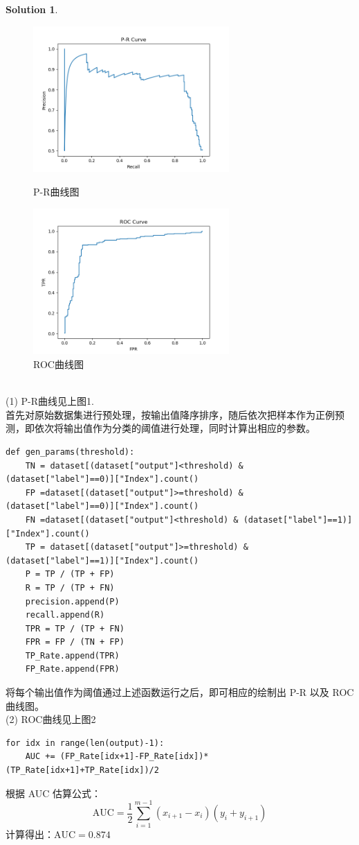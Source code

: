 \documentclass[a4paper,UTF8]{article}
\theoremstyle{definition}
\newtheorem*{solution}{Solution}
\begin{document}
\begin{solution}
\begin{figure}[htbp]
\centering
\begin{minipage}[t]{0.48\textwidth}
\centering
\includegraphics[width=7.5cm]{Figure_1.png}
\caption{P-R曲线图}
\end{minipage}
\begin{minipage}[t]{0.48\textwidth}
\centering
\includegraphics[width=7.5cm]{Figure_2.png}
\caption{ROC曲线图}
\end{minipage}
\end{figure}
~\\(1) P-R曲线见上图1.\\首先对原始数据集进行预处理，按输出值降序排序，随后依次把样本作为正例预测，即依次将输出值作为分类的阈值进行处理，同时计算出相应的参数。
\begin{lstlisting}
def gen_params(threshold):
    TN = dataset[(dataset["output"]<threshold) & (dataset["label"]==0)]["Index"].count()
    FP =dataset[(dataset["output"]>=threshold) & (dataset["label"]==0)]["Index"].count()
    FN =dataset[(dataset["output"]<threshold) & (dataset["label"]==1)]["Index"].count()
    TP = dataset[(dataset["output"]>=threshold) & (dataset["label"]==1)]["Index"].count()
    P = TP / (TP + FP)
    R = TP / (TP + FN)
    precision.append(P)
    recall.append(R)
    TPR = TP / (TP + FN)
    FPR = FP / (TN + FP)
    TP_Rate.append(TPR)
    FP_Rate.append(FPR)
\end{lstlisting}
将每个输出值作为阈值通过上述函数运行之后，即可相应的绘制出 P-R 以及 ROC 曲线图。
~\\(2) ROC曲线见上图2
\begin{lstlisting}
for idx in range(len(output)-1):
    AUC += (FP_Rate[idx+1]-FP_Rate[idx])*(TP_Rate[idx+1]+TP_Rate[idx])/2    
\end{lstlisting}
根据 AUC 估算公式：
$$\text{AUC}=\frac{1}{2}\sum^{m-1}_{i=1}(x_{i+1}-x_i)(y_i+y_{i+1})$$
计算得出：$\text{AUC} = 0.874$
\end{solution}
\end{document}
